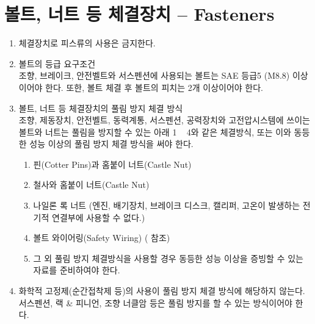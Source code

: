 \documentclass[final,a4paper,10pt]{report}
\begin{document}
\section{볼트, 너트 등 체결장치 – Fasteners}\label{rule:formula-technical.fasteners} \label{section:체결장치}
\begin{enumerate}
  \item\label{rule:formula-technical.fasteners.no-tapping-screws} 체결장치로 피스류의 사용은 금지한다.
  \item\label{rule:formula-technical.fasteners.grade5-critical-systems} 볼트의 등급 요구조건\\
    조향, 브레이크, 안전벨트와 서스펜션에 사용되는 볼트는 SAE 등급5 (M8.8) 이상이어야 한다. 또한, 볼트 체결 후 볼트의 피치는 2개 이상이어야 한다.
  \item\label{rule:formula-technical.fasteners.anti-loosening-methods} 볼트, 너트 등 체결장치의 풀림 방지 체결 방식\\ \label{item:체결장치의 풀림 방지}
    조향, 제동장치, 안전벨트, 동력계통, 서스펜션, 공력장치와 고전압시스템에 쓰이는 볼트와 너트는 풀림을 방지할 수 있는 아래 1 \string~ 4와 같은 체결방식, 또는 이와 동등한 성능 이상의 풀림 방지 체결 방식을 써야 한다.
    \begin{enumerate}
      \item\label{rule:formula-technical.fasteners.anti-loosening-methods.cotter-pin-castle-nut} 핀(Cotter Pins)과 홈붙이 너트(Castle Nut)
      \item\label{rule:formula-technical.fasteners.anti-loosening-methods.wire-castle-nut} 철사와 홈붙이 너트(Castle Nut)
      \item\label{rule:formula-technical.fasteners.anti-loosening-methods.nylon-lock-nut} 나일론 록 너트 (엔진, 배기장치, 브레이크 디스크, 캘리퍼, 고온이 발생하는 전기적 연결부에 사용할 수 없다.)
      \item\label{rule:formula-technical.fasteners.anti-loosening-methods.safety-wiring} 볼트 와이어링(Safety Wiring) ( 참조)
      \item\label{rule:formula-technical.fasteners.anti-loosening-methods.equivalent-method-proof} 그 외 풀림 방지 체결방식을 사용할 경우 동등한 성능 이상을 증빙할 수 있는 자료를 준비하여야 한다.
    \end{enumerate}
  \item\label{rule:formula-technical.fasteners.no-chemical-thread-locker} 화학적 고정제(순간접착제 등)의 사용이 풀림 방지 체결 방식에 해당하지 않는다. 서스펜션, 랙 \& 피니언, 조향 너클암 등은 풀림 방지를 할 수 있는 방식이어야 한다.
\end{enumerate}
\end{document}
